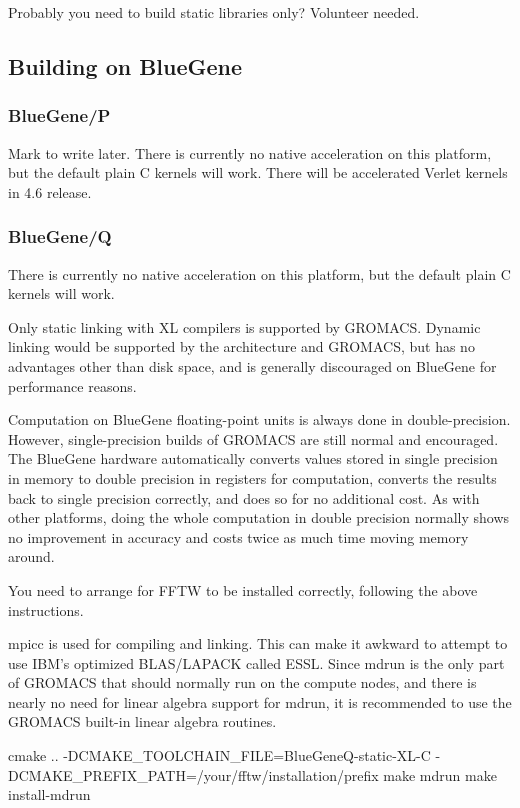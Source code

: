 \documentclass{article}[12pt,a4paper,twoside]
\newcommand{\gromacs}{GROMACS}
\begin{document}
Probably you need to build static libraries only? Volunteer needed.

\subsection{Building on BlueGene}

\subsubsection{BlueGene/P}

Mark to write later. There is currently no native acceleration on this
platform, but the default plain C kernels will work. There will be
accelerated Verlet kernels in 4.6 release.

\subsubsection{BlueGene/Q}

There is currently no native acceleration on this platform, but the
default plain C kernels will work.

Only static linking with XL compilers is supported by \gromacs{}. Dynamic
linking would be supported by the architecture and \gromacs{}, but has no
advantages other than disk space, and is generally discouraged on
BlueGene for performance reasons.

Computation on BlueGene floating-point units is always done in
double-precision. However, single-precision builds of \gromacs{} are
still normal and encouraged. The BlueGene hardware automatically
converts values stored in single precision in memory to double
precision in registers for computation, converts the results back to
single precision correctly, and does so for no additional cost. As
with other platforms, doing the whole computation in double precision
normally shows no improvement in accuracy and costs twice as much time
moving memory around.

You need to arrange for FFTW to be installed correctly, following the
above instructions.

mpicc is used for compiling and linking. This can make it awkward to
attempt to use IBM's optimized BLAS/LAPACK called ESSL. Since mdrun is
the only part of \gromacs{} that should normally run on the compute
nodes, and there is nearly no need for linear algebra support for
mdrun, it is recommended to use the \gromacs{} built-in linear algebra
routines.

cmake .. -DCMAKE_TOOLCHAIN_FILE=BlueGeneQ-static-XL-C -DCMAKE_PREFIX_PATH=/your/fftw/installation/prefix
make mdrun
make install-mdrun
\end{document}

